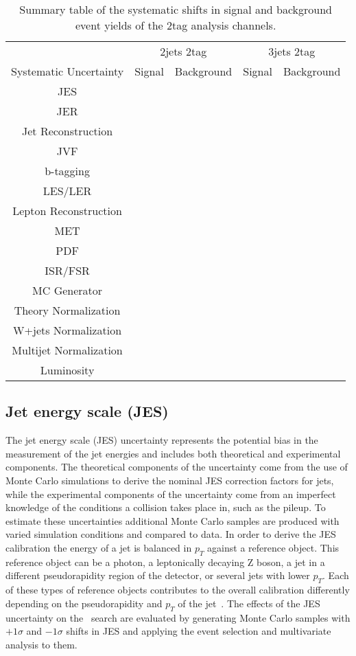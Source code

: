 \begin{table}
\begin{center}
\begin{tabular}{|c|cc|cc|}
\hline
 & \multicolumn{2}{|c|}{2jets 2tag} & \multicolumn{2}{|c|}{3jets 2tag} \\
Systematic Uncertainty & Signal & Background & Signal & Background \\
\hline
JES & & & & \\
JER & & & & \\
Jet Reconstruction & & & &\\
JVF & & & & \\
b-tagging & & & & \\
LES/LER & & & & \\
Lepton Reconstruction & & & & \\
MET & & & & \\
PDF & & & & \\
ISR/FSR & & & & \\
MC Generator & & & & \\
Theory Normalization & & & & \\
W+jets Normalization & & & & \\
Multijet Normalization & & & & \\
Luminosity & & & & \\
\hline
\end{tabular}
\caption{Summary table of the systematic shifts in signal and background event yields of the 2tag analysis channels.}
\label{TABLE-RESULTS-2TAGSYSTEMATICS}
\end{center}
\end{table}

\subsection{Jet energy scale (JES)}
\label{SECTION-RESULTS-SYSTEMATICS-JES}
The jet energy scale (JES) uncertainty represents the potential bias in the measurement of the jet energies and includes both theoretical and experimental components. The theoretical components of the uncertainty come from the use of Monte Carlo simulations to derive the nominal JES correction factors for jets, while the experimental components of the uncertainty come from an imperfect knowledge of the conditions a collision takes place in, such as the pileup. To estimate these uncertainties additional Monte Carlo samples are produced with varied simulation conditions and compared to data. In order to derive the JES calibration the energy of a jet is balanced in $p_T$ against a reference object. This reference object can be a photon, a leptonically decaying Z boson, a jet in a different pseudorapidity region of the detector, or several jets with lower $p_T$. Each of these types of reference objects contributes to the overall calibration differently depending on the pseudorapidity and $p_T$ of the jet~\cite{JES}. The effects of the JES uncertainty on the \Wprime\ search are evaluated by generating Monte Carlo samples with $+1\sigma$ and $-1\sigma$ shifts in JES and applying the event selection and multivariate analysis to them.

